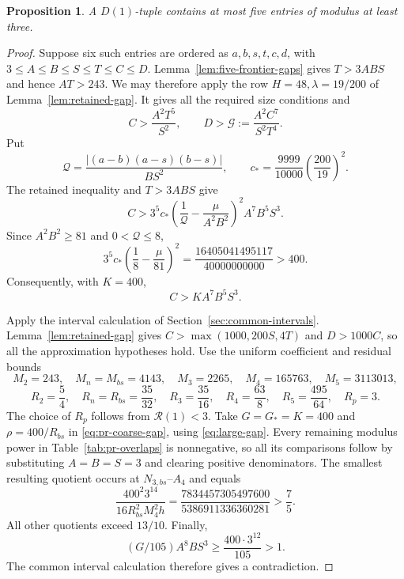 \documentclass[12pt]{article}
\newtheorem{proposition}[theorem]{Proposition}
\numberwithin{equation}{section}
\begin{document}
\begin{proposition}\label{prop:no-all-large-six}
A \(D(1)\)-tuple contains at most five entries of modulus at least three.
\end{proposition}
\begin{proof}
Suppose six such entries are ordered as \(a,b,s,t,c,d\), with
\(3\le A\le B\le S\le T\le C\le D\).
Lemma~\ref{lem:five-frontier-gaps} gives \(T>3ABS\) and hence \(AT>243\).
We may therefore apply the row \(H=48,\lambda=19/200\) of
Lemma~\ref{lem:retained-gap}. It gives all the required size conditions and
\begin{equation}\label{eq:integrated-6}
C>\frac{A^2T^5}{S^2},\qquad
 D>\mathcal G:=\frac{A^2C^7}{S^2T^4}.
\end{equation}
Put
\[
 \mathcal Q=\frac{|(a-b)(a-s)(b-s)|}{BS^2},\qquad
 c_*=\frac{9999}{10000}\left(\frac{200}{19}\right)^2.
\]
The retained inequality and \(T>3ABS\) give
\[
 C>3^5c_*\left(\frac1{\mathcal Q}-\frac{\mu}{A^2B^2}\right)^2
                         A^7B^5S^3.
\]
Since \(A^2B^2\ge81\) and \(0<\mathcal Q\le8\),
\[
 3^5c_*\left(\frac18-\frac{\mu}{81}\right)^2
 =\frac{16405041495117}{40000000000}>400.
\]
Consequently, with \(K=400\),
\begin{equation}\label{eq:large-gap}
 C>KA^7B^5S^3.
\end{equation}

Apply the interval calculation of Section~\ref{sec:common-intervals}.
Lemma~\ref{lem:retained-gap} gives $C>\max(1000,200S,4T)$
and $D>1000C$, so all the approximation hypotheses hold.
Use the uniform coefficient and residual bounds
\[
 M_2=243,\quad M_n=M_{bs}=4143,\quad M_3=2265,\quad
 M_4=165763,\quad M_5=3113013,
\]
\[
 R_2=\frac54,\quad R_n=R_{bs}=\frac{35}{32},\quad
 R_3=\frac{35}{16},\quad R_4=\frac{63}{8},\quad
 R_5=\frac{495}{64},\quad R_p=3.
\]
The choice of $R_p$ follows from $\mathcal R(1)<3$.
Take $G=G_*=K=400$ and $\rho=400/R_{bs}$ in
\eqref{eq:pr-coarse-gap}, using \eqref{eq:large-gap}.
Every remaining modulus power in Table~\ref{tab:pr-overlaps}
is nonnegative, so all its comparisons follow by substituting
$A=B=S=3$ and clearing positive denominators.
The smallest resulting quotient occurs at $N_{3,bs}$--$A_4$ and equals
\[
 \frac{400^2 3^{14}}{16R_{bs}^2M_4^2h}
 =\frac{7834457305497600}{5386911336360281}>\frac75.
\]
All other quotients exceed $13/10$. Finally,
\[
 (G/105)A^8BS^3\ge\frac{400\cdot3^{12}}{105}>1.
\]
The common interval calculation therefore gives a contradiction.
\end{proof}
\end{document}
